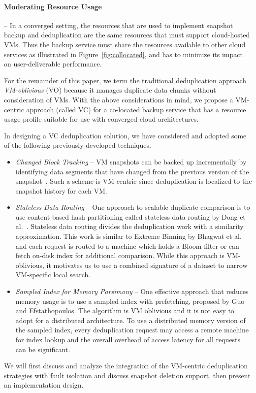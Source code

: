 \paragraph*{Moderating Resource Usage} --
In a converged setting, the resources that are used to implement snapshot
backup and deduplication are the same resources that must support cloud-hosted
VMs.  Thus the backup service must share the resources available to
other cloud services as illustrated in Figure~\ref{fig:collocated},
and has to minimize its impact on user-deliverable performance.

For the remainder of this paper, 
we term the traditional deduplication approach {\em VM-oblivious} (VO)
because it manages duplicate data chunks without consideration of VMs.
With the above  considerations in mind, we propose a 
VM-centric approach (called VC)
for a co-located backup service that has a resource usage profile
suitable for use with converged cloud architectures.  

In designing a VC deduplication solution, we have considered and adopted some of
the following previously-developed techniques.
\begin{itemize}
\item {\em Changed Block Tracking} --
VM snapshots can be  backed up  incrementally by identifying data segments that have
changed from the previous version of the snapshot~\cite{Clements2009,Vrable2009,TanIPDPS2011}.
Such a scheme  is  VM-centric since deduplication is localized to the snapshot
history for each VM.
\item {\em Stateless  Data Routing} --
One approach to scalable duplicate comparison is to use content-based hash
partitioning called stateless data routing by Dong et al.~\cite{Dong2011}.
Stateless data routing divides the deduplication work with a similarity approximation. This work 
is similar to Extreme Binning by Bhagwat et al.~\cite{extreme_binning09} and 
each request is routed  to a machine which holds
a Bloom filter  or can fetch on-disk index for additional comparison.
While this approach is VM-oblivious, it motivates us to  use  a combined signature of a dataset to narrow
VM-specific local search.
\item {\em Sampled Index for Memory Parsimony} -- 
One effective approach that reduces memory usage is 
to use a sampled index with prefetching, proposed  by Guo and Efstathopoulos\cite{Guo2011}. 
The algorithm is VM oblivious and it is not easy  to adopt for a distributed architecture. 
To use a distributed memory version of the sampled index, every deduplication request
may access a remote machine for index lookup and the overall overhead of access latency for all requests
can be significant.  
\end{itemize}

We will first discuss and analyze the integration of the VM-centric deduplication strategies with fault isolation 
and discuss snapshot deletion support, then present an implementation design. 
